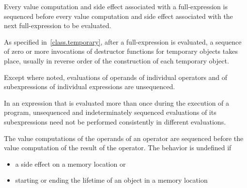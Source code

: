\pnum
Every
%
value computation and
%
side effect associated with a full-expression is
sequenced before every value computation and side effect associated with the
next full-expression to be evaluated.
\begin{footnote}
As specified
in~\ref{class.temporary}, after a full-expression is evaluated, a sequence of
zero or more invocations of destructor functions for temporary objects takes
place, usually in reverse order of the construction of each temporary object.
\end{footnote}

\pnum
{}%
Except where noted, evaluations of operands of individual operators and
of subexpressions of individual expressions are unsequenced.
\begin{note}
In an expression that is evaluated more than once during the execution
of a program, unsequenced and indeterminately sequenced evaluations of
its subexpressions need not be performed consistently in different
evaluations.
\end{note}
The value computations of the operands of an
operator are sequenced before the value computation of the result of the
operator.
The behavior is undefined if
%
%
%
%
%
%
\begin{itemize}
\item
{}%
a side effect on a memory location or
\item
starting or ending the lifetime of an object in a memory location
\end{itemize}
